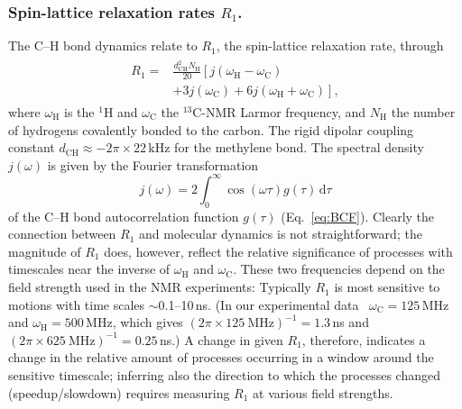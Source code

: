 \documentclass[journal=jcisd8,manuscript=article,layout=twocolumn]{achemso}
\begin{document}
\subsubsection*{Spin-lattice relaxation rates $R_1$.}
The \mbox{C--H} bond dynamics relate to $R_1$, the spin-lattice relaxation rate, through
\begin{align}
\label{eq:R1}
\begin{split}
R_{1}=&\frac{d^2_{\mathrm{CH}}N_{\mathrm{H}}}{20}\left[j(\omega_{\mathrm{H}}-\omega_{\mathrm{C}})\right. \\
&\left.+3j(\omega_{\mathrm{C}})+6j(\omega_{\mathrm{H}}+\omega_{\mathrm{C}})\right],
\end{split}
\end{align}
where $\omega_{\mathrm{H}}$ is the $^1$H and $\omega_{\mathrm{C}}$ the $^{13}$C-NMR Larmor frequency, and $N_{\mathrm{H}}$ the number of hydrogens covalently bonded to the carbon.
The rigid dipolar coupling constant $d_{\mathrm{CH}}\approx-2\pi\times22$\,kHz for the methylene bond.
The spectral density $j(\omega)$ is given by the Fourier transformation
\begin{equation}
j{(\omega)}=2\int_{0}^{\infty}\cos(\omega\tau)g(\tau)\,\mathrm d\tau
\end{equation}
of the C--H bond autocorrelation function $g(\tau)$ (Eq.~\eqref{eq:BCF}).
Clearly
the connection between $R_1$ and molecular dynamics is not straightforward;
the magnitude of $R_1$ does, however, reflect the relative significance of processes
with timescales near the inverse of $\omega_{\mathrm{H}}$ and $\omega_{\mathrm{C}}$. These two frequencies depend on the field strength used in the NMR experiments: Typically
$R_1$ is most sensitive to motions with time scales $\sim$0.1--10\,ns.
%
(In our experimental data~\cite{ferreira15,pham15,Volke:1995a,Antila:2020a}
$\omega_\mathrm C=125$\,MHz and $\omega_\mathrm H=500$\,MHz,
which gives
$(2\pi\times125~\mathrm{MHz})^{-1}=1.3$\,ns and
$(2\pi\times625~\mathrm{MHz})^{-1}=0.25$\,ns.)
%
A change in given $R_{1}$, therefore, indicates a change in the relative amount of processes
occurring in a window around the sensitive timescale;
%
%
%
%
inferring also the direction to which the processes changed (speedup/slowdown)
requires measuring $R_1$ at various field strengths.
\end{document}

